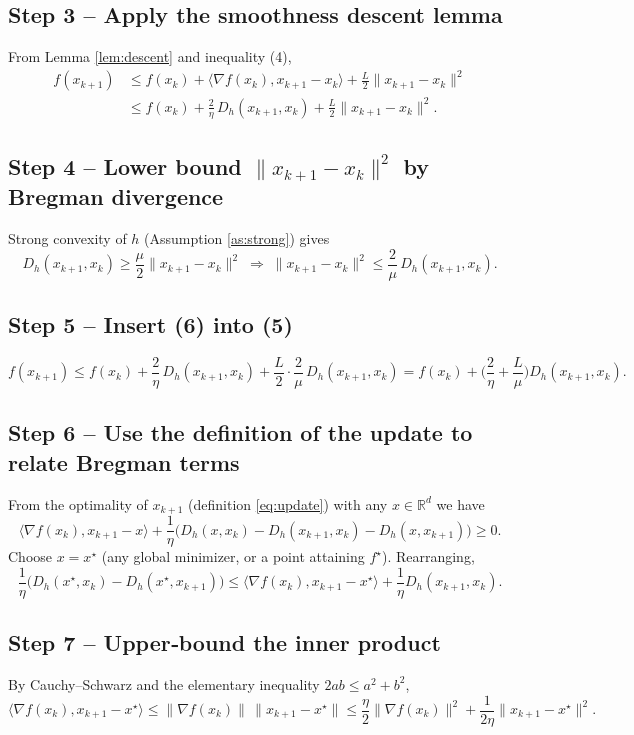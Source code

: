 \documentclass{article}
\newcommand{\grad}{\nabla}
\newcommand{\Breg}{D_h}
\newcommand{\R}{\mathbb{R}}
\begin{document}
\subsection*{Step 3 – Apply the smoothness descent lemma}
From Lemma \ref{lem:descent} and inequality (4),
\[
\begin{aligned}
f(x_{k+1})
&\le f(x_k)+\langle \grad f(x_k),x_{k+1}-x_k\rangle
       +\frac{L}{2}\|x_{k+1}-x_k\|^{2}\\[2mm]
&\le f(x_k)+\frac{2}{\eta}\,\Breg(x_{k+1},x_k)
       +\frac{L}{2}\|x_{k+1}-x_k\|^{2}.
\end{aligned}
\tag{5}
\]

\subsection*{Step 4 – Lower bound $\|x_{k+1}-x_k\|^{2}$ by Bregman divergence}
Strong convexity of $h$ (Assumption \ref{as:strong}) gives
\[
\Breg(x_{k+1},x_k)\ge\frac{\mu}{2}\|x_{k+1}-x_k\|^{2}
\;\Longrightarrow\;
\|x_{k+1}-x_k\|^{2}\le\frac{2}{\mu}\,\Breg(x_{k+1},x_k).
\tag{6}
\]

\subsection*{Step 5 – Insert (6) into (5)}
\[
f(x_{k+1})
\le f(x_k)+\frac{2}{\eta}\,\Breg(x_{k+1},x_k)
      +\frac{L}{2}\cdot\frac{2}{\mu}\,\Breg(x_{k+1},x_k)
= f(x_k)+\Big(\frac{2}{\eta}+\frac{L}{\mu}\Big)\Breg(x_{k+1},x_k).
\tag{7}
\]

\subsection*{Step 6 – Use the definition of the update to relate Bregman terms}
From the optimality of $x_{k+1}$ (definition \eqref{eq:update}) with any
$x\in\R^{d}$ we have
\[
\langle \grad f(x_k),x_{k+1}-x\rangle+\frac{1}{\eta}
\bigl(\Breg(x,x_k)-\Breg(x_{k+1},x_k)-\Breg(x,x_{k+1})\bigr)\ge 0.
\tag{8}
\]
Choose $x=x^\star$ (any global minimizer, or a point attaining $f^\star$). Rearranging,
\[
\frac{1}{\eta}\bigl(\Breg(x^\star,x_k)-\Breg(x^\star,x_{k+1})\bigr)
\le
\langle \grad f(x_k),x_{k+1}-x^\star\rangle
+\frac{1}{\eta}\Breg(x_{k+1},x_k).
\tag{9}
\]

\subsection*{Step 7 – Upper‑bound the inner product}
By Cauchy–Schwarz and the elementary inequality $2ab\le a^{2}+b^{2}$,
\[
\langle \grad f(x_k),x_{k+1}-x^\star\rangle
\le
\|\grad f(x_k)\|\,\|x_{k+1}-x^\star\|
\le
\frac{\eta}{2}\|\grad f(x_k)\|^{2}
   +\frac{1}{2\eta}\|x_{k+1}-x^\star\|^{2}.
\tag{10}
\]
\end{document}
